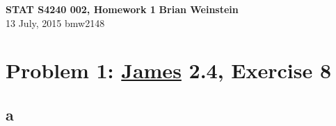 \documentclass[11pt]{article}
\begin{document}
\noindent
\large\textbf{STAT S4240 002, Homework 1} \hfill \textbf{Brian Weinstein}\\
\normalsize 13 July, 2015 \hfill  bmw2148\\


\section*{Problem 1: \href{http://www-bcf.usc.edu/~gareth/ISL/}{James} 2.4, Exercise 8}

\subsection*{a}
\end{document}
